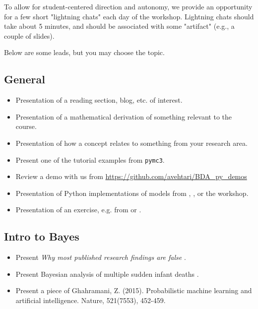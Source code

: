\documentclass{article} %
\begin{document}
To allow for student-centered direction and autonomy, we provide an opportunity for a few short "lightning chats" each day of the workshop.   Lightning chats should take about 5 minutes, and should be associated with some "artifact" (e.g., a couple of slides).

	
Below are some leads, but you may choose the topic.

\subsection{General}
\begin{itemize}
\item Presentation of a reading section,  blog,  etc.  of interest.
\item Presentation of a mathematical derivation of something relevant to the course.
\item Presentation of how a concept relates to something from your research area.
\item Present one of the tutorial examples from \texttt{pymc3}.
\item Review a demo with us from \url{https://github.com/avehtari/BDA_py_demos}
\item Presentation of Python implementations of models from \cite{hoff2009first} ,  \cite{ gelman2013bayesian},  or the workshop.
\item Presentation of an exercise, e.g. from \cite{hoff2009first} or \cite{gelman2013bayesian}.
\end{itemize}

\subsection{Intro to Bayes} 
\begin{itemize}
\item Present \textit{Why most published research findings are false} \cite{ioannidis2005most}.
\item Present Bayesian analysis of multiple sudden infant deaths  \cite{hill2004multiple}.
\item Present a piece of Ghahramani, Z. (2015). Probabilistic machine learning and artificial intelligence. Nature, 521(7553), 452-459.  
\end{itemize}
\end{document}
